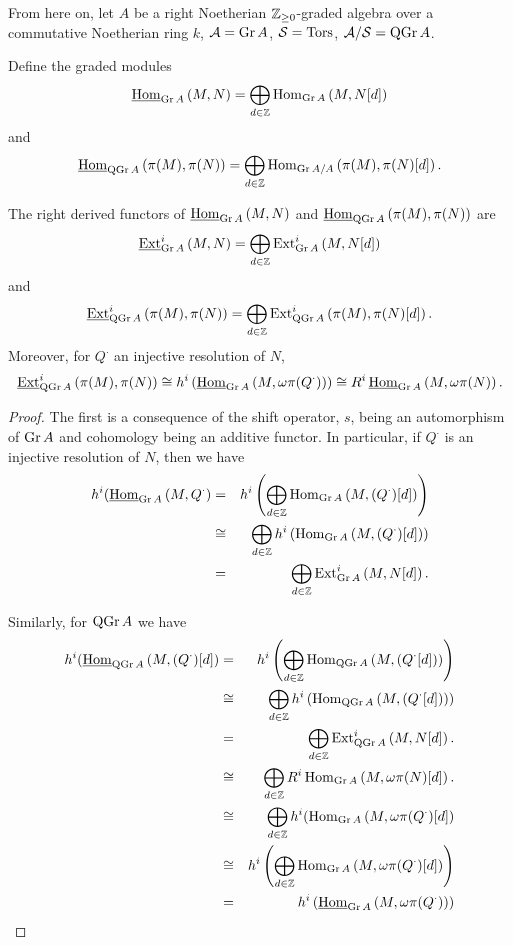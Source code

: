 \documentclass[dissertation.tex]{subfiles}
\begin{document}
From here on, let $A$ be a right Noetherian $\Z_{\geq 0}$-graded algebra over a commutative Noetherian ring $k$, $\A = \Gr{A}$, $\mathcal{S} = \Tors$, $\A/\mathcal{S} = \QGr{A}$.

\begin{defn}
  Define the graded modules
  $$\HOM{\Gr{A}}{M,N} = \bigoplus_{d \in \Z} \Hom{\Gr{A}}{M, N[d]}$$ 
  and 
  $$\HOM{\QGr{A}}{\pi(M), \pi(N)} = \bigoplus_{d \in \Z} \Hom{\Gr{A}/A}{\pi(M), \pi(N)[d]}.$$
\end{defn}


\begin{prop}\label{prop2}
  The right derived functors of $\HOM{\Gr{A}}{M,N}$ and $\HOM{\QGr{A}}{\pi(M), \pi(N)}$ are
  $$\EXT{i}{\Gr{A}}{M,N} = \bigoplus_{d \in \Z}\Ext{i}{\Gr{A}}{M,N[d]}$$
  and
  $$\EXT{i}{\QGr{A}}{\pi(M),\pi(N)} = \bigoplus_{d \in \Z}\Ext{i}{\QGr{A}}{\pi(M),\pi(N)[d]}.$$
  Moreover, for $Q^\cdot$ an injective resolution of $N$, 
  $$\EXT{i}{\QGr{A}}{\pi(M), \pi(N)} \cong h^i\left(\HOM{\Gr{A}}{M, \omega\pi(Q^\cdot)}\right) \cong R^i\HOM{\Gr{A}}{M, \omega\pi(N)}.$$
  
  \begin{proof}
    The first is a consequence of the shift operator, $s$, being an automorphism of $\Gr{A}$ and cohomology being an additive functor.
    In particular, if $Q^\cdot$ is an injective resolution of $N$, then we have
    \begin{eqnarray*}
      h^i(\HOM{\Gr{A}}{M, Q^\cdot} &=& h^i\left(\bigoplus_{d \in \Z}\Hom{\Gr{A}}{M, (Q^\cdot)[d]}\right)\\
      &\cong& \bigoplus_{d \in \Z} h^i\left(\Hom{\Gr{A}}{M, (Q^\cdot)[d]}\right)\\
      &=& \bigoplus_{d \in \Z} \Ext{i}{\Gr{A}}{M, N[d]}.
    \end{eqnarray*}

    Similarly, for $\QGr{A}$ we have
    \begin{eqnarray*}
      h^i(\HOM{\QGr{A}}{M, (Q^\cdot)[d]} &=& h^i\left(\bigoplus_{d \in \Z}\Hom{\QGr{A}}{M,(Q^\cdot[d])}\right)\\ 
      &\cong& \bigoplus_{d \in \Z} h^i\left(\Hom{\QGr{A}}{M, (Q^\cdot[d])}\right)\\
      &=& \bigoplus_{d \in \Z} \Ext{i}{\QGr{A}}{M, N[d]}.\\
      &\cong& \bigoplus_{d \in \Z} R^i\Hom{\Gr{A}}{M, \omega\pi(N)[d]}.\\
      &\cong& \bigoplus_{d \in \Z} h^i(\Hom{\Gr{A}}{M, \omega\pi(Q^\cdot)[d]}\\
      &\cong& h^i\left(\bigoplus_{d \in \Z}\Hom{\Gr{A}}{M, \omega\pi(Q^\cdot)[d]}\right)\\
      &=& h^i\left(\HOM{\Gr{A}}{M, \omega\pi(Q^\cdot)}\right)
    \end{eqnarray*}
  \end{proof}
\end{prop}
\end{document}
